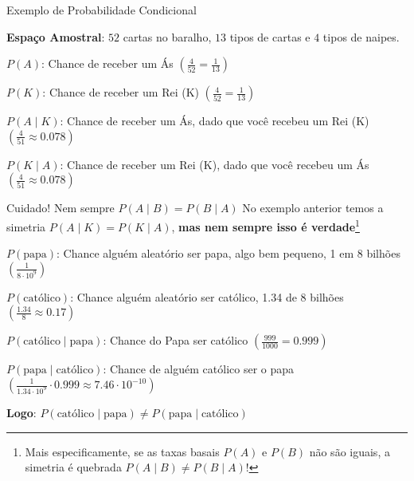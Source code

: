 \begin{frame}{Exemplo de Probabilidade Condicional}
    \begin{exemplo}
        \begin{vfilleditems}
            \item \textbf{Espaço Amostral}: $52$ cartas no baralho, $13$ tipos de cartas e $4$ tipos de naipes.
            \item $P(A)$: Chance de receber um Ás $\left( \frac{4}{52} = \frac{1}{13}\right)$
            \item $P(K)$: Chance de receber um Rei (K) $\left( \frac{4}{52} = \frac{1}{13} \right)$
            \item $P(A \mid K)$: Chance de receber um Ás, dado que você recebeu um Rei (K) $\left( \frac{4}{51} \approx 0.078 \right)$
            \item $P(K \mid A)$: Chance de receber um Rei (K), dado que você recebeu um Ás $\left( \frac{4}{51} \approx 0.078 \right)$
        \end{vfilleditems}
    \end{exemplo}
\end{frame}

\begin{frame}{Cuidado! Nem sempre $P(A \mid B) = P(B \mid A)$}
    No exemplo anterior temos a simetria $P(A \mid K) = P(K \mid A)$, \textbf{mas nem sempre isso é verdade}\footnote{Mais especificamente, se as taxas basais $P(A)$ e $P(B)$ não são iguais, a simetria é quebrada $P(A \mid B) \neq P(B \mid A)$!}
    \begin{exemplo}
        \begin{vfilleditems}
            \small{
            \item $P(\text{papa})$: Chance alguém aleatório ser papa, algo bem pequeno, 1 em 8 bilhões $\left( \frac{1}{8 \cdot 10^9} \right)$
            \item $P(\text{católico})$: Chance alguém aleatório ser católico, 1.34 de 8 bilhões $\left( \frac{1.34}{8} \approx 0.17 \right)$
            \item $P(\text{católico} \mid \text{papa})$: Chance do Papa ser católico $\left( \frac{999}{1000} = 0.999 \right)$
            \item $P(\text{papa} \mid \text{católico})$: Chance de alguém católico ser o papa $\left( \frac{1}{1.34 \cdot 10^9} \cdot 0.999 \approx 7.46 \cdot 10^{-10} \right)$
            }
            \item \large{\textbf{Logo}: $P(\text{católico} \mid \text{papa}) \neq P(\text{papa} \mid \text{católico})$}
        \end{vfilleditems}
    \end{exemplo}
\end{frame}


